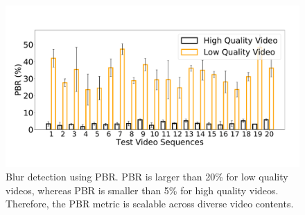 \begin{figure}[t]
  \centering
  \includegraphics[width=\linewidth]{sections/network-work/bar-pbr}
  \caption{Blur detection using PBR. PBR is larger than 20\% for low quality videos, whereas PBR is smaller than 5\%  for high quality videos. Therefore, the PBR metric is scalable across diverse video contents.}
  \label{fig:ourblurdetection}
\end{figure}

